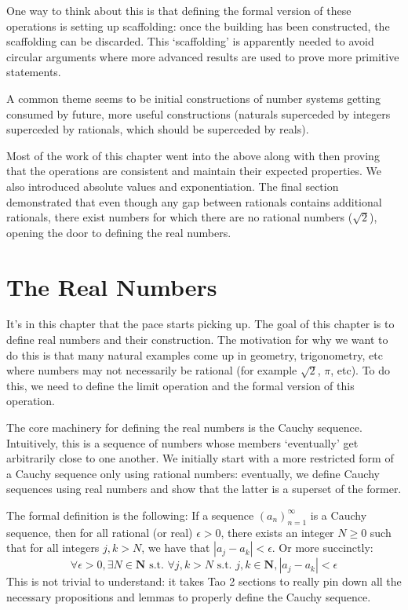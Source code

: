 \documentclass[answers,12pt]{exam}
\newcommand{\suchthat}{\text{ s.t. }}
\begin{document}
One way to think about this is that defining the formal version of these operations is setting up scaffolding: once the building has been constructed, the scaffolding can be discarded. This `scaffolding' is apparently needed to avoid circular arguments where more advanced results are used to prove more primitive statements.

A common theme seems to be initial constructions of number systems getting consumed by future, more useful constructions (naturals superceded by integers superceded by rationals, which should be superceded by reals).

Most of the work of this chapter went into the above along with then proving that the operations are consistent and maintain their expected properties.
We also introduced absolute values and exponentiation.
The final section demonstrated that even though any gap between rationals contains additional rationals, there exist numbers for which there are no rational numbers ($\sqrt{2}$), opening the door to defining the real numbers.

\section{The Real Numbers}
It's in this chapter that the pace starts picking up.
The goal of this chapter is to define real numbers and their construction.
The motivation for why we want to do this is that many natural examples come up in geometry, trigonometry, etc where numbers may not necessarily be rational (for example $\sqrt{2}$, $\pi$, etc).
To do this, we need to define the limit operation and the formal version of this operation.

The core machinery for defining the real numbers is the Cauchy sequence.
Intuitively, this is a sequence of numbers whose members `eventually' get arbitrarily close to one another.
We initially start with a more restricted form of a Cauchy sequence only using rational numbers: eventually, we define Cauchy sequences using real numbers and show that the latter is a superset of the former.

The formal definition is the following:
If a sequence $(a_n)_{n=1}^{\infty}$ is a Cauchy sequence, then for all rational (or real) $\epsilon > 0$, there exists an integer $N \geq 0$ such that for all integers $j,k > N$, we have that $|a_j - a_k| < \epsilon$.
Or more succinctly:
\[
    \forall \epsilon > 0, \exists N \in \mathbf{N} \suchthat \forall j,k >N \suchthat j,k \in \mathbf{N}, |a_j - a_k| < \epsilon
\]
This is not trivial to understand: it takes Tao 2 sections to really pin down all the necessary propositions and lemmas to properly define the Cauchy sequence.
\end{document}
